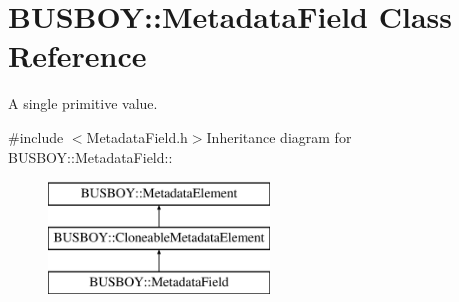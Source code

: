 \hypertarget{classBUSBOY_1_1MetadataField}{
\section{BUSBOY::MetadataField Class Reference}
\label{classBUSBOY_1_1MetadataField}
}


A single primitive value.  


{\ttfamily \#include $<$MetadataField.h$>$}Inheritance diagram for BUSBOY::MetadataField::\begin{figure}[H]
\begin{center}
\leavevmode
\includegraphics[height=3cm]{classBUSBOY_1_1MetadataField}
\end{center}
\end{figure}
